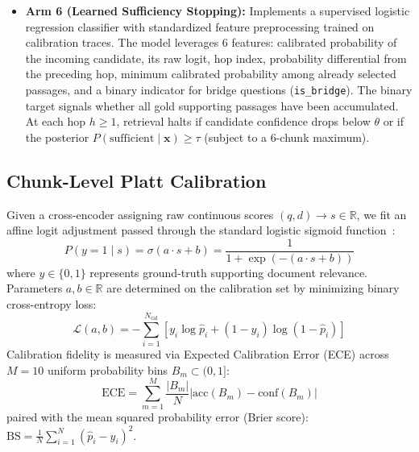 \documentclass[conference]{IEEEtran}
\begin{document}
\begin{itemize}
    \item \textbf{Arm 6 (Learned Sufficiency Stopping):} Implements a supervised logistic regression classifier with standardized feature preprocessing trained on calibration traces. The model leverages 6 features: calibrated probability of the incoming candidate, its raw logit, hop index, probability differential from the preceding hop, minimum calibrated probability among already selected passages, and a binary indicator for bridge questions (\texttt{is\_bridge}). The binary target signals whether all gold supporting passages have been accumulated. At each hop $h \ge 1$, retrieval halts if candidate confidence drops below $\theta$ or if the posterior $P(\text{sufficient} \mid \mathbf{x}) \ge \tau$ (subject to a 6-chunk maximum).
\end{itemize}

\subsection{Chunk-Level Platt Calibration}
Given a cross-encoder assigning raw continuous scores $(q, d) \to s \in \mathbb{R}$, we fit an affine logit adjustment passed through the standard logistic sigmoid function~\cite{platt1999probabilistic}:
\begin{equation}
    P(y = 1 \mid s) = \sigma(a \cdot s + b) = \frac{1}{1 + \exp(-(a \cdot s + b))}
\end{equation}
where $y \in \{0, 1\}$ represents ground-truth supporting document relevance. Parameters $a, b \in \mathbb{R}$ are determined on the calibration set by minimizing binary cross-entropy loss:
\begin{equation}
    \mathcal{L}(a, b) = -\sum_{i=1}^{N_{\text{cal}}} \left[ y_i \log \hat{p}_i + (1 - y_i) \log(1 - \hat{p}_i) \right]
\end{equation}
Calibration fidelity is measured via Expected Calibration Error (ECE) across $M=10$ uniform probability bins $B_m \subset (0, 1]$:
\begin{equation}
    \text{ECE} = \sum_{m=1}^M \frac{|B_m|}{N} \left| \text{acc}(B_m) - \text{conf}(B_m) \right|
\end{equation}
paired with the mean squared probability error (Brier score): $\text{BS} = \frac{1}{N}\sum_{i=1}^N (\hat{p}_i - y_i)^2$.
\end{document}
